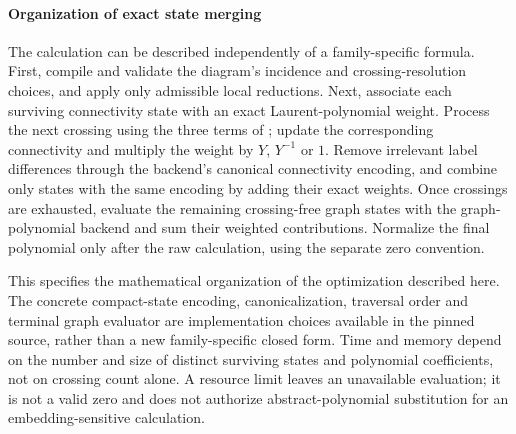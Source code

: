 \documentclass[10pt,twocolumn]{article}
\begin{document}
\paragraph{Organization of exact state merging}
The calculation can be described independently of a family-specific formula. First, compile and validate the diagram's incidence and crossing-resolution choices, and apply only admissible local reductions. Next, associate each surviving connectivity state with an exact Laurent-polynomial weight. Process the next crossing using the three terms of ; update the corresponding connectivity and multiply the weight by $Y$, $Y^{-1}$ or $1$. Remove irrelevant label differences through the backend's canonical connectivity encoding, and combine only states with the same encoding by adding their exact weights. Once crossings are exhausted, evaluate the remaining crossing-free graph states with the graph-polynomial backend and sum their weighted contributions. Normalize the final polynomial only after the raw calculation, using the separate zero convention.

This specifies the mathematical organization of the optimization described here. The concrete compact-state encoding, canonicalization, traversal order and terminal graph evaluator are implementation choices available in the pinned source, rather than a new family-specific closed form. Time and memory depend on the number and size of distinct surviving states and polynomial coefficients, not on crossing count alone. A resource limit leaves an unavailable evaluation; it is not a valid zero and does not authorize abstract-polynomial substitution for an embedding-sensitive calculation.
\end{document}
